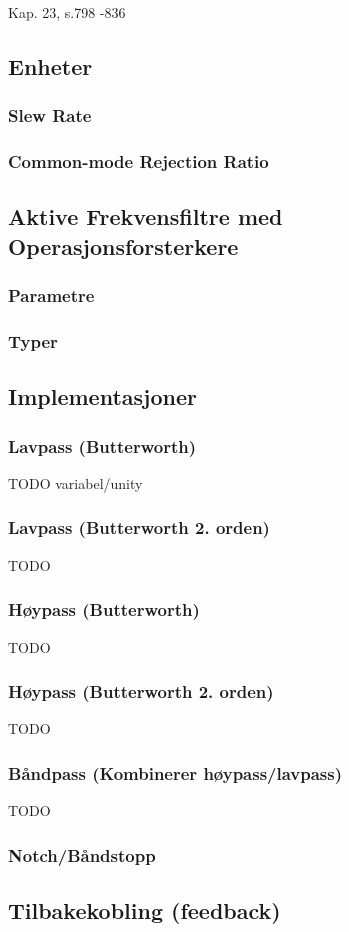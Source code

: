 Kap. 23, s.798 -836

\subsection{Enheter}
  \subsubsection{Slew Rate}
    
  \subsubsection{Common-mode Rejection Ratio}
    
\subsection{Aktive Frekvensfiltre med Operasjonsforsterkere}
  
  \subsubsection{Parametre}
    
  \subsubsection{Typer}
    
\subsection{Implementasjoner}
  \subsubsection{Lavpass (Butterworth)}
    TODO variabel/unity
  \subsubsection{Lavpass (Butterworth 2. orden)}
    TODO
  \subsubsection{Høypass (Butterworth)}
    TODO
  \subsubsection{Høypass (Butterworth 2. orden)}
    TODO
  \subsubsection{Båndpass (Kombinerer høypass/lavpass)}
    TODO
  \subsubsection{Notch/Båndstopp}
    
\subsection{Tilbakekobling (feedback)}
  
